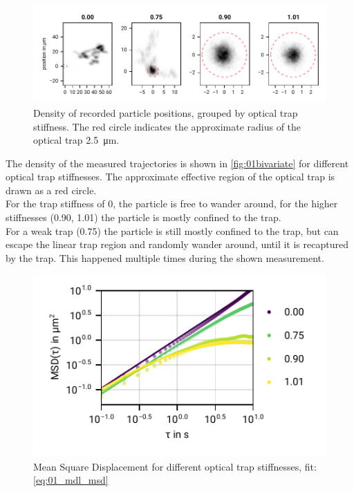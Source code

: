 \documentclass[
    twoside=false,
    twocolumn=true,
    fontsize=11pt,
]{scrarticle}
\begin{document}
\begin{figure}
    \centering
    \includegraphics{figures/01_03_1_bivariate.pdf}
    \caption{Density of recorded particle positions, grouped by optical trap stiffness. The red circle indicates the approximate radius of the optical trap \SI{2.5}{\micro m}.}
    \label{fig:01bivariate}
\end{figure}
The density of the measured trajectories is shown in \autoref{fig:01bivariate} for different optical trap stiffnesses.
The approximate effective region of the optical trap is drawn as a red circle.\\
For the trap stiffness of \SI{0}{}, the particle is free to wander around, for the higher stiffnesses (\SI{0.90}{}, \SI{1.01}{}) the particle is mostly confined to the trap.\\
For a weak trap (\SI{0.75}{}) the particle is still mostly confined to the trap, but can escape the linear trap region and randomly wander around, until it is recaptured by the trap.
This happened multiple times during the shown measurement.

\begin{figure}
    \centering
    \includegraphics{figures/01_02_2_msd.pdf}
    \caption{Mean Square Displacement for different optical trap stiffnesses, fit: \autoref{eq:01_mdl_msd}}
    \label{fig:01msd}
\end{figure}
\end{document}
